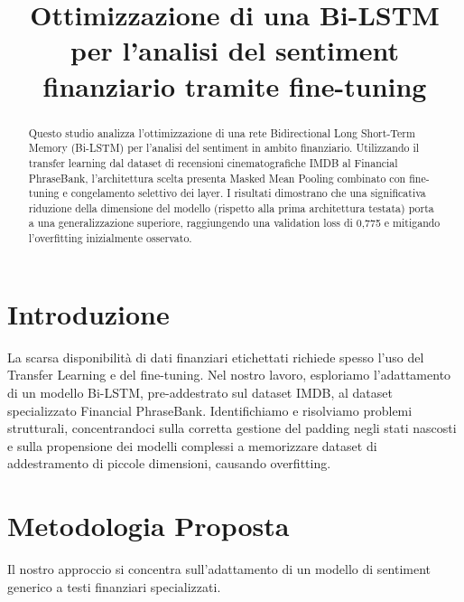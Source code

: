 \documentclass[conference]{IEEEtran}
\begin{document}
\title{Ottimizzazione di una Bi-LSTM per l'analisi del sentiment finanziario tramite fine-tuning}

\author{
    \and
}

\maketitle

\begin{abstract}
    Questo studio analizza l'ottimizzazione di una rete Bidirectional Long Short-Term Memory (Bi-LSTM) per l'analisi del sentiment in ambito finanziario. Utilizzando il transfer learning dal dataset di recensioni cinematografiche IMDB al Financial PhraseBank, l'architettura scelta presenta Masked Mean Pooling combinato con fine-tuning e congelamento selettivo dei layer. I risultati dimostrano che una significativa riduzione della dimensione del modello (rispetto alla prima architettura testata) porta a una generalizzazione superiore, raggiungendo una validation loss di 0,775 e mitigando l'overfitting inizialmente osservato.
\end{abstract}

\section{Introduzione}
La scarsa disponibilità di dati finanziari etichettati richiede spesso l'uso del Transfer Learning e del fine-tuning. Nel nostro lavoro, esploriamo l'adattamento di un modello Bi-LSTM, pre-addestrato sul dataset IMDB, al dataset specializzato Financial PhraseBank. Identifichiamo e risolviamo problemi strutturali, concentrandoci sulla corretta gestione del padding negli stati nascosti e sulla propensione dei modelli complessi a memorizzare dataset di addestramento di piccole dimensioni, causando overfitting.

\section{Metodologia Proposta}
Il nostro approccio si concentra sull'adattamento di un modello di sentiment generico a testi finanziari specializzati.
\end{document}
